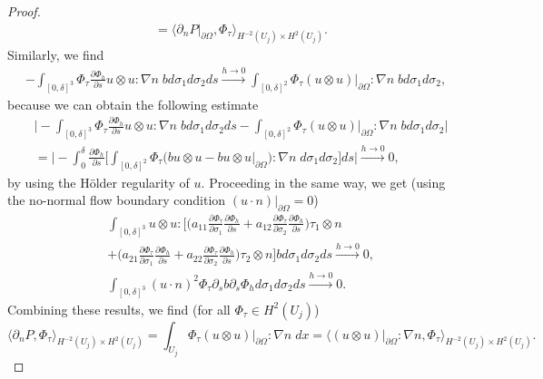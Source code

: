 \documentclass[12pt,a4paper]{article}
\theoremstyle{definition}
\theoremstyle{remark}
\numberwithin{equation}{section}
\begin{document}
\begin{proof}
\begin{align*}
&= \langle \partial_n P \lvert_{\partial \Omega} , \Phi_\tau \rangle_{H^{-2} (U_j) \times H^2 (U_j)}.
\end{align*}
Similarly, we find
\begin{align*}
- \int_{[0,\delta]^3} \Phi_\tau \frac{\partial \Phi_h}{\partial s} u \otimes u : \nabla n \; b d \sigma_1 d\sigma_2 ds \xrightarrow[]{h \rightarrow 0} \int_{[0,\delta]^2} \Phi_\tau (u \otimes u)\lvert_{\partial \Omega} : \nabla n \; b d \sigma_1 d\sigma_2,
\end{align*}
because we can obtain the following estimate
\begin{align*}
&\bigg\lvert - \int_{[0,\delta]^3} \Phi_\tau \frac{\partial \Phi_h}{\partial s} u \otimes u : \nabla n \; b d \sigma_1 d\sigma_2 ds - \int_{[0,\delta]^2} \Phi_\tau (u \otimes u)\lvert_{\partial \Omega} : \nabla n \; b d \sigma_1 d\sigma_2 \bigg\rvert \\
&= \bigg\lvert - \int_0^\delta \frac{\partial \Phi_h}{\partial s} \bigg[ \int_{[0,\delta]^2} \Phi_\tau  \big( b u \otimes u - b  u \otimes u \lvert_{\partial \Omega} \big) : \nabla n \; d \sigma_1 d\sigma_2 \bigg]  ds \bigg\rvert \xrightarrow[]{h \rightarrow 0} 0,
\end{align*}
by using the Hölder regularity of $u$. Proceeding in the same way, we get (using the no-normal flow boundary condition $(u \cdot n) \lvert_{\partial \Omega} = 0$)
\begin{align*}
&\int_{[0,\delta]^3} u \otimes u : \bigg[  \bigg( a_{11} \frac{\partial \Phi_\tau}{\partial \sigma_1} \frac{\partial \Phi_h}{\partial s} + a_{12} \frac{\partial \Phi_\tau}{\partial \sigma_2} \frac{\partial \Phi_h}{\partial s} \bigg) \tau_1 \otimes n \\
&+ \bigg( a_{21} \frac{\partial \Phi_\tau}{\partial \sigma_1} \frac{\partial \Phi_h}{\partial s} + a_{22} \frac{\partial \Phi_\tau}{\partial \sigma_2} \frac{\partial \Phi_h}{\partial s} \bigg) \tau_2 \otimes n \bigg] b d \sigma_1 d\sigma_2 ds \xrightarrow[]{h \rightarrow 0} 0, \\
&\int_{[0,\delta]^3} (u \cdot n)^2  \Phi_\tau \partial_s b \partial_s \Phi_h d \sigma_1 d\sigma_2 ds \xrightarrow[]{h \rightarrow 0} 0.
\end{align*}
Combining these results, we find (for all $\Phi_\tau \in H^2 (U_j)$)
\begin{equation}
\langle \partial_n P , \Phi_\tau \rangle_{H^{-2} (U_j) \times H^2 (U_j)} = \int_{U_j} \Phi_\tau (u \otimes u)\lvert_{\partial \Omega} : \nabla n \; d x = \langle (u \otimes u)\lvert_{\partial \Omega} : \nabla n , \Phi_\tau \rangle_{H^{-2} (U_j) \times H^2 (U_j)}.

\end{equation}
\end{proof}
\end{document}
